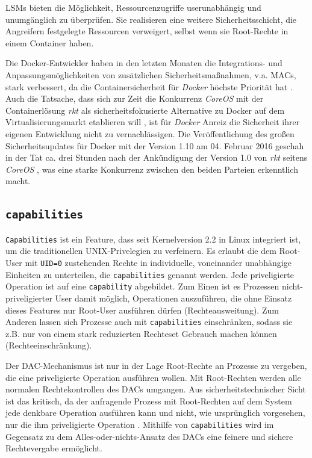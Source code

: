 \documentclass[../main.tex]{subfiles}
\begin{document}
		LSMs bieten die Möglichkeit, Ressourcenzugriffe userunabhängig und unumgänglich zu überprüfen.
		Sie realisieren eine weitere Sicherheitsschicht, die Angreifern festgelegte Ressourcen verweigert, selbst wenn sie Root-Rechte in einem Container haben.

		Die Docker-Entwickler haben in den letzten Monaten die Integrations- und Anpassungsmöglichkeiten von zusätzlichen Sicherheitsmaßnahmen, v.a. MACs, stark verbessert, da die Containersicherheit für \emph{Docker} höchste Priorität hat \cite{githubDockerRoadmap}\cite{githubDockerChangelog}. Auch die Tatsache, dass sich zur Zeit die Konkurrenz \emph{CoreOS} mit der Containerlösung \emph{rkt} als sicherheitsfokusierte Alternative zu Docker auf dem Virtualisierungsmarkt etablieren will \cite{coreosAnnouncementRkt10}, ist für \emph{Docker} Anreiz die Sicherheit ihrer eigenen Entwicklung nicht zu vernachlässigen.
		Die Veröffentlichung des großen Sicherheitsupdates für Docker mit der Version 1.10 am 04. Februar 2016 geschah in der Tat ca. drei Stunden nach der Ankündigung der Version 1.0 von \emph{rkt} seitens \emph{CoreOS} \cite{hnAnnouncementDocker110}\cite{hnAnnouncementRkt10}, was eine starke Konkurrenz zwischen den beiden Parteien erkenntlich macht.
    \subsection{\texttt{capabilities}}
			\texttt{Capabilities} ist ein Feature, dass seit Kernelversion 2.2 in Linux integriert ist, um die traditionellen UNIX-Privelegien zu verfeinern. Es erlaubt die dem Root-User mit \texttt{UID=0} zustehenden Rechte in individuelle, voneinander unabhängige Einheiten zu unterteilen, die \texttt{capabilities} genannt werden. Jede priveligierte Operation ist auf eine \texttt{capability} abgebildet.
			Zum Einen ist es Prozessen nicht-priveligierter User damit möglich, Operationen auszuführen, die ohne Einsatz dieses Features nur Root-User ausführen dürfen (Rechteausweitung). Zum Anderen lassen sich Prozesse auch mit \texttt{capabilities} einschränken, sodass sie z.B. nur von einem stark reduzierten Rechteset Gebrauch machen können (Rechteeinschränkung)\cite[S.33]{linuxInterface}.

			Der DAC-Mechanismus ist nur in der Lage Root-Rechte an Prozesse zu vergeben, die eine priveligierte Operation ausführen wollen. Mit Root-Rechten werden alle normalen Rechtekontrollen des DACs umgangen.	Aus sicherheitstechnischer Sicht ist das kritisch, da der anfragende Prozess mit Root-Rechten auf dem System jede denkbare Operation ausführen kann und nicht, wie ursprünglich vorgesehen, nur die ihm priveligierte Operation \cite[S.797]{linuxInterface}. Mithilfe von \texttt{capabilities} wird im Gegensatz zu dem \glqq{}Alles-oder-nichts\grqq{}-Ansatz des DACs eine feinere und sichere Rechtevergabe ermöglicht.
\end{document}
